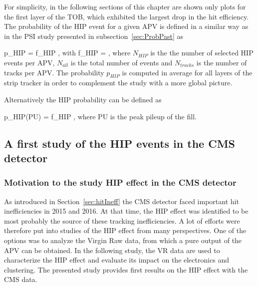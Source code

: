 
For simplicity, in the following sections of this chapter are shown only plots for the first layer of the TOB, which exhibited the largest drop in the hit efficiency. The probability of the HIP event for a given APV is defined in a similar way as in the PSI study presented in subsection~\ref{sec:ProbPast} as


{
p_{HIP} = f_{HIP} ,
}
with
{
f_{HIP} = ,
}
where $N_{HIP}$ is the the number of selected HIP events per APV, $N_{all}$ is the total number of events and $N_{tracks}$ is the number of tracks per APV. The probability $p_{HIP}$ is computed in average for all layers of the strip tracker in order to complement the study with a more global picture.

Alternatively the HIP probability can be defined as

{
p_{HIP}(PU) = f_{HIP} ,
}
where PU is the peak pileup of the fill. 



\subsection{A first study of the HIP events in the CMS detector~\label{sec:firstStudy}}

\subsubsection{Motivation to the study HIP effect in the CMS detector}

As introduced in Section~\ref{sec:hitIneff} the CMS detector faced important hit inefficiencies in 2015 and 2016. At that time, the HIP effect was identified to be most probably the source of these tracking inefficiencies. A lot of efforts were therefore put into studies of the HIP effect from many perspectives. One of the options was to analyze the Virgin Raw data, from which a pure output of the APV can be obtained. In the following study, the VR data are used to characterize the HIP effect and evaluate its impact on the electronics and clustering. The presented study provides first results on the HIP effect with the CMS data.

